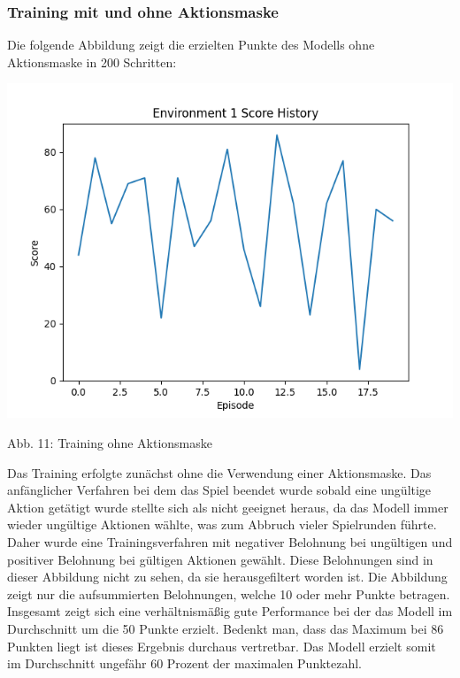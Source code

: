 \subsubsection{Training mit und ohne Aktionsmaske}
\begin{minipage}{\linewidth}
	Die folgende Abbildung zeigt die erzielten Punkte des Modells ohne Aktionsmaske in 200 Schritten:
	
	\vspace{0.5cm}
	\includegraphics[width=1\textwidth]{Bilder/trainingwithoutcancalation}
	
	Abb. 11: Training ohne Aktionsmaske\\
\end{minipage}

Das Training erfolgte zunächst ohne die Verwendung einer Aktionsmaske. Das anfänglicher Verfahren bei dem das Spiel beendet wurde sobald eine ungültige Aktion getätigt wurde stellte sich als nicht geeignet heraus, da das Modell immer wieder ungültige Aktionen wählte, was zum Abbruch vieler Spielrunden führte. Daher wurde eine Trainingsverfahren mit negativer Belohnung bei ungültigen und positiver Belohnung bei gültigen Aktionen gewählt. Diese Belohnungen sind in dieser Abbildung nicht zu sehen, da sie herausgefiltert worden ist. Die Abbildung zeigt nur die aufsummierten Belohnungen, welche 10 oder mehr Punkte betragen. Insgesamt zeigt sich eine verhältnismäßig gute Performance bei der das Modell im Durchschnitt um die 50 Punkte erzielt. Bedenkt man, dass das Maximum bei 86 Punkten liegt ist dieses Ergebnis durchaus vertretbar. Das Modell erzielt somit im Durchschnitt ungefähr 60 Prozent der maximalen Punktezahl.

